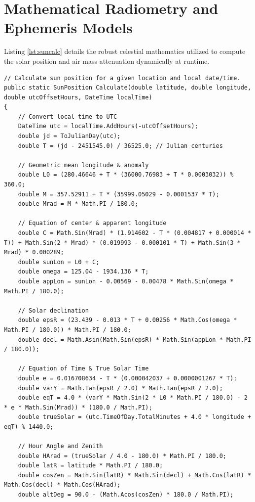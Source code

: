 \section{Mathematical Radiometry and Ephemeris Models}
\label{apx:math_models}

Listing \ref{lst:suncalc} details the robust celestial mathematics utilized to compute the solar position and air mass attenuation dynamically at runtime.

\begin{lstlisting}[language={[Sharp]C}, caption={SunCalculator.cs: Calculates solar altitude, azimuth, and direct beam illuminance using the Kasten-Young air mass formula.}, label={lst:suncalc}]
// Calculate sun position for a given location and local date/time.
public static SunPosition Calculate(double latitude, double longitude, double utcOffsetHours, DateTime localTime)
{
    // Convert local time to UTC
    DateTime utc = localTime.AddHours(-utcOffsetHours);
    double jd = ToJulianDay(utc);
    double T = (jd - 2451545.0) / 36525.0; // Julian centuries

    // Geometric mean longitude & anomaly
    double L0 = (280.46646 + T * (36000.76983 + T * 0.0003032)) % 360.0;
    double M = 357.52911 + T * (35999.05029 - 0.0001537 * T);
    double Mrad = M * Math.PI / 180.0;

    // Equation of center & apparent longitude
    double C = Math.Sin(Mrad) * (1.914602 - T * (0.004817 + 0.000014 * T)) + Math.Sin(2 * Mrad) * (0.019993 - 0.000101 * T) + Math.Sin(3 * Mrad) * 0.000289;
    double sunLon = L0 + C;
    double omega = 125.04 - 1934.136 * T;
    double appLon = sunLon - 0.00569 - 0.00478 * Math.Sin(omega * Math.PI / 180.0);

    // Solar declination
    double epsR = (23.439 - 0.013 * T + 0.00256 * Math.Cos(omega * Math.PI / 180.0)) * Math.PI / 180.0;
    double decl = Math.Asin(Math.Sin(epsR) * Math.Sin(appLon * Math.PI / 180.0));

    // Equation of Time & True Solar Time
    double e = 0.016708634 - T * (0.000042037 + 0.0000001267 * T);
    double varY = Math.Tan(epsR / 2.0) * Math.Tan(epsR / 2.0);
    double eqT = 4.0 * (varY * Math.Sin(2 * L0 * Math.PI / 180.0) - 2 * e * Math.Sin(Mrad)) * (180.0 / Math.PI);
    double trueSolar = (utc.TimeOfDay.TotalMinutes + 4.0 * longitude + eqT) % 1440.0;
    
    // Hour Angle and Zenith
    double HArad = (trueSolar / 4.0 - 180.0) * Math.PI / 180.0;
    double latR = latitude * Math.PI / 180.0;
    double cosZen = Math.Sin(latR) * Math.Sin(decl) + Math.Cos(latR) * Math.Cos(decl) * Math.Cos(HArad);
    double altDeg = 90.0 - (Math.Acos(cosZen) * 180.0 / Math.PI);


\end{lstlisting}

